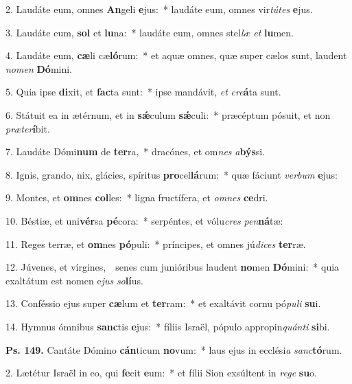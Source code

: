 
2. Laudáte eum, omnes \textbf{An}geli \textbf{e}jus:~* laudáte eum, omnes vir\textit{tú}\textit{tes} \textbf{e}jus.

3. Laudáte eum, \textbf{sol} et \textbf{lu}na:~* laudáte eum, omnes stel\textit{læ} \textit{et} \textbf{lu}men.

4. Laudáte eum, \textbf{cæ}li cæ\textbf{ló}rum:~* et aquæ omnes, quæ super cælos sunt, laudent \textit{no}\textit{men} \textbf{Dó}mini.

5. Quia ipse \textbf{di}xit, et \textbf{fac}ta sunt:~* ipse mandávit, \textit{et} \textit{cre}\textbf{á}ta sunt.

6. Státuit ea in ætérnum, et in \textbf{s\'{\ae}}culum \textbf{s\'{\ae}}culi:~* præcéptum pósuit, et non \textit{præ}\textit{ter}\textbf{í}bit.

7. Laudáte Dómi\textbf{num} de \textbf{ter}ra,~* dracónes, et om\textit{nes} \textit{a}\textbf{býs}si.

8. Ignis, grando, nix, glácies, spíritus \textbf{pro}cel\textbf{lá}rum:~* quæ fáciunt \textit{ver}\textit{bum} \textbf{e}jus:

9. Montes, et \textbf{om}nes \textbf{col}les:~* ligna fructífera, et \textit{om}\textit{nes} \textbf{ce}dri.

10. Béstiæ, et uni\textbf{vér}sa \textbf{pé}cora:~* serpéntes, et vólu\textit{cres} \textit{pen}\textbf{ná}tæ:

11. Reges terræ, et \textbf{om}nes \textbf{pó}puli:~* príncipes, et omnes jú\textit{di}\textit{ces} \textbf{ter}ræ.

12. Júvenes, et vírgines,~\GreDagger\ senes cum junióribus laudent \textbf{no}men \textbf{Dó}mini:~* quia exaltátum est nomen e\textit{jus} \textit{so}\textbf{lí}us.

13. Conféssio ejus super \textbf{cæ}lum et \textbf{ter}ram:~* et exaltávit cornu pó\textit{pu}\textit{li} \textbf{su}i.

14. Hymnus ómnibus \textbf{sanc}tis \textbf{e}jus:~* fíliis Israël, pópulo appropin\textit{quán}\textit{ti} \textbf{si}bi.

\textbf{Ps. 149.} Cantáte Dómino \textbf{cán}ticum \textbf{no}vum:~* laus ejus in ecclési\textit{a} \textit{sanc}\textbf{tó}rum.

2. Lætétur Israël in eo, qui \textbf{fe}cit \textbf{e}um:~* et fílii Sion exsúltent in \textit{re}\textit{ge} \textbf{su}o.

